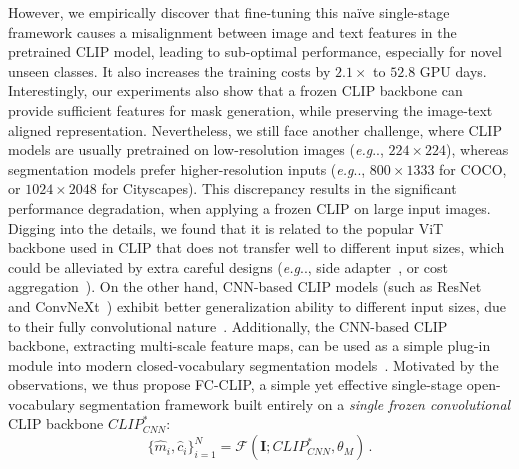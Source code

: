 \documentclass{article}
\makeatletter
\DeclareRobustCommand\onedot{\futurelet\@let@token\@onedot}
\def\@onedot{\ifx\@let@token.\else.\null\fi\xspace}
\def\eg{\emph{e.g}\onedot}
\newcommand{\modelname}{FC-CLIP\xspace}
\makeatother
\begin{document}
However, we empirically discover that fine-tuning this na\"ive single-stage framework causes a misalignment between image and text features in the pretrained CLIP model, leading to sub-optimal performance, especially for novel unseen classes. It also increases the training costs by $2.1\times$ to $52.8$ GPU days.
Interestingly, our experiments also show that a frozen CLIP backbone can provide sufficient features for mask generation, while preserving the image-text aligned representation.
Nevertheless, we still face another challenge, where CLIP models are usually pretrained on low-resolution images (\eg, $224\times224$), whereas segmentation models prefer higher-resolution inputs (\eg, $800\times1333$ for COCO, or $1024\times2048$ for Cityscapes).
This discrepancy results in the significant performance degradation, when applying a frozen CLIP on large input images.
Digging into the details, we found that it is related to the popular ViT~\cite{dosovitskiy2020image} backbone used in CLIP that does not transfer well to different input sizes, which could be alleviated by extra careful designs (\eg, side adapter~\cite{chen2023vision,xu2023side}, or cost aggregation~\cite{zhou2022extract,cho2023cat}).
On the other hand, CNN-based CLIP models (such as ResNet~\cite{he2016deep} and ConvNeXt~\cite{liu2022convnet}) exhibit better generalization ability to different input sizes, due to their fully convolutional nature~\cite{long2014fully}.
Additionally, the CNN-based CLIP backbone, extracting multi-scale feature maps, can be used as a simple plug-in module into modern closed-vocabulary segmentation models~\cite{cheng2021masked,yu2022k}.
Motivated by the observations, we thus propose \modelname, a simple yet effective single-stage open-vocabulary segmentation framework built entirely on a \textit{single frozen convolutional} CLIP backbone $CLIP_{CNN}^*$:
\begin{equation}
\{\hat{m}_i, \hat{c}_i\}_{i=1}^N = \mathcal{F}(\mathbf{I}; CLIP_{CNN}^*, \theta_M) \,.
\end{equation}
\end{document}
